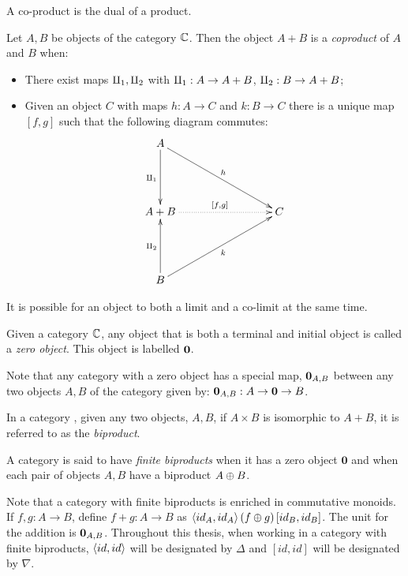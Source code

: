 A co-product is the dual of a product.

\begin{definition}\label{def:categorical_coproduct}
  Let $A,B$ be objects of the category $\mathbb{C}$. Then the object $A + B$ is a \emph{coproduct} of
  $A$ and $B$ when:
  \begin{itemize}
    \item There exist maps $\amalg_{1}, \amalg_{2}$ with $\amalg_{1}:A \to A + B$, $\amalg_{2}:B \to A+ B$;
    \item Given an object $C$ with maps $h:A\to C$ and $k:B \to C$ there is a unique map
    $[f,g]$ such that the following diagram commutes:
    \[
      \xymatrix@C+15pt@R+25pt{
        A \ar[drr]^h \ar[d]_{\cpa} \\
        A +B \ar@{.>}[rr]^{[f,g]} && C\\
        B \ar[urr]_k \ar[u]^{\cpb}
      }
    \]
  \end{itemize}
\end{definition}

It is possible for an object to both a limit and a co-limit at the same time.
\begin{definition}\label{def:categorical_zero}
  Given a category $\mathbb{C}$, any object that is both a terminal and initial object is called a
  \emph{zero object}. This object is labelled $\mathbf{0}$.
\end{definition}

Note that any category with a zero object has a special map, $\mathbf{0}_{A,B}$
between any two objects $A,B$ of the category given by: $\mathbf{0}_{A,B} : A \to \mathbf{0} \to B$.

\begin{definition}\label{def:categorical_biproduct}
  In a category \C, given any two objects, $A,B$, if $A\times B$ is isomorphic to $A+B$,  it is
  referred to as the \emph{biproduct}.
\end{definition}

\begin{definition}\label{def:finite_biproducts}
A category \cD{} is said to have \emph{finite biproducts} when it has a zero object $\mathbf{0}$
and when each pair of objects $A,B$ have a biproduct $A\oplus B$.
\end{definition}

Note that a category with finite biproducts is enriched in commutative monoids. If $f,g:A\to
B$, define $f+g:A\to B$ as $\langle id_{A}, id_{A}\rangle\, (f\oplus g)\, [id_{B},id_{B}]$. The unit for the
addition is $\mathbf{0}_{A,B}$. Throughout this thesis, when working in a category with finite
biproducts, $\langle id, id\rangle$ will be designated by $\Delta$ and $[id,id]$ will be designated by
$\nabla$.

